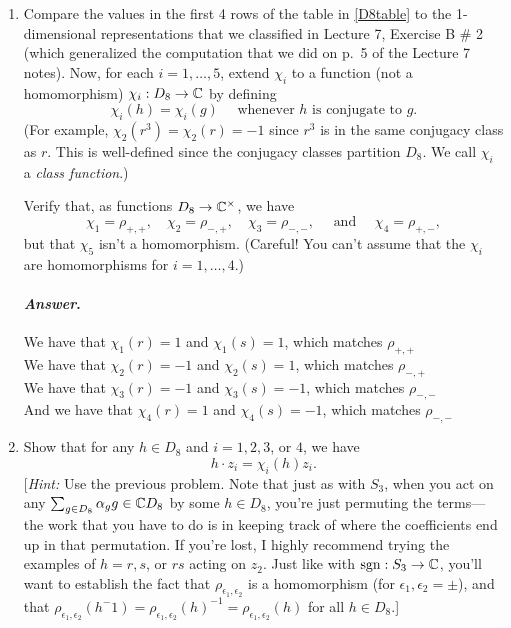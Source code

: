\documentclass[11pt, reqno]{amsart}
\theoremstyle{plain}
\theoremstyle{definition}
\theoremstyle{example}
\newenvironment{ans}{\medskip \paragraph*{\emph{Answer}.}}{\hfill \break  $~\!\!$ \dotfill \medskip }
\def\sgn{\mathrm{sgn}}
\begin{document}
\begin{enumerate}[1.]
\begin{enumerate}
\item Compare the values in the first 4 rows of the table in \eqref{D8table} to the 1-dimensional representations that we classified in Lecture 7, Exercise B \# 2 (which generalized the computation that we did on p.\ 5 of the Lecture 7 notes). Now, for each $i = 1, \dots, 5$, extend $\chi_i$ to a function (not a homomorphism) $\chi_i: D_8 \to \mathbb{C}$ by defining 
$$\chi_i(h) = \chi_i(g) \quad \text{ whenever $h$ is conjugate to $g$.}$$
(For example, $\chi_2(r^3) = \chi_2(r) = -1$ since $r^3$ is in the same conjugacy class as $r$. This is well-defined since the conjugacy classes partition $D_8$. We call $\chi_i$ a \emph{class function}.)

\medskip

Verify that, as functions $D_8 \to \mathbb{C}^\times$, we have 
$$\chi_1 = \rho_{+,+}, \quad \chi_2 = \rho_{-,+}, \quad \chi_3 = \rho_{-,-}, \quad \text{ and } \quad \chi_4 = \rho_{+,-},$$
but that $\chi_5$ isn't a homomorphism. (Careful! You can't assume that the $\chi_i$ are homomorphisms for $i = 1, \dots, 4$.)
\begin{ans}
We have that $\chi_1(r) = 1$ and $\chi_1(s) = 1$, which matches $\rho_{+,+}$\\

We have that $\chi_2(r) = -1$ and $\chi_2(s) = 1$, which matches $\rho_{-,+}$\\

We have that $\chi_3(r) = -1$ and $\chi_3(s) = -1$, which matches $\rho_{-,-}$\\

And we have that $\chi_4(r) = 1$ and $\chi_4(s) = -1$, which matches $\rho_{-,-}$
\end{ans}

\item Show that for any $h \in D_8$ and $i = 1, 2, 3$, or $4$, we have 
$$h \cdot z_i = \chi_i(h) z_i.$$
{[\emph{Hint:} Use the previous problem. Note that just as with $S_3$, when you act on any $\sum_{g \in D_8} \alpha_g g \in \mathbb{C} D_8$ by some $h \in D_8$, you're just permuting the terms---the work that you have to do is in keeping track of where the coefficients end up in that permutation. If you're lost, I highly recommend trying the examples of $h = r, s$, or $rs$ acting on $z_2$. Just like with $\sgn: S_3 \to \CC$, you'll want to establish the fact that $\rho_{\epsilon_1, \epsilon_2}$ is a homomorphism (for $\epsilon_1, \epsilon_2 = \pm$), and that $\rho_{\epsilon_1, \epsilon_2}(h^-1) = \rho_{\epsilon_1, \epsilon_2}(h)^{-1} = \rho_{\epsilon_1, \epsilon_2}(h)$ for all $h \in D_8$.]}



\end{enumerate}
\end{enumerate}
\end{document}
